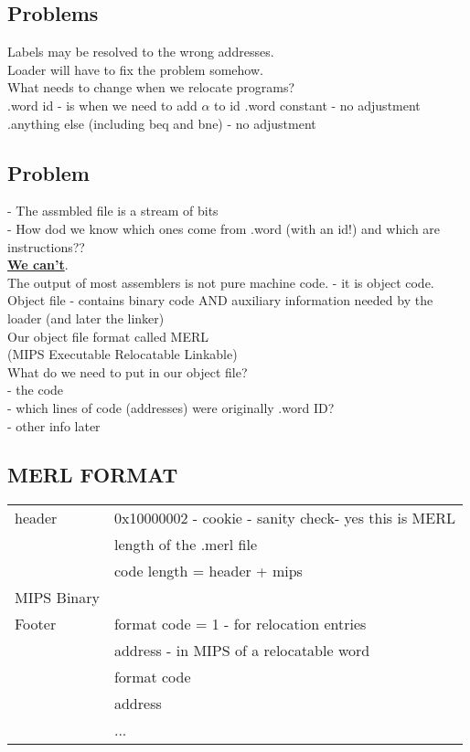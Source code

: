 \documentclass[12pt]{article}
\newcommand{\myt}[1]{\textbf{\underline{#1}}}
\begin{document}
	\subsection*{Problems}
	
	Labels may be resolved to the wrong addresses.\\
	Loader will have to fix the problem somehow.\\
	
	What needs to change when we relocate programs?\\
	
	.word id - is when we need to add $\alpha$ to id
	.word constant - no adjustment\\
	.anything else (including beq and bne) - no adjustment\\
	
	\subsection*{Problem}
	- The assmbled file is a stream of bits\\
	- How dod we know which ones come from .word (with an id!) and which are instructions??\\
	\myt{We can't}.\\
	
	The output of most assemblers is not pure machine code. - it is object code.\\
	
	Object file - contains binary code AND auxiliary information needed by the loader (and later the linker)\\
	
	Our object file format called MERL\\
	(MIPS Executable Relocatable Linkable)\\
	
	What do we need to put in our object file?\\
	- the code\\
	- which lines of code (addresses) were originally .word ID?\\
	- other info later
	
	\subsection{MERL FORMAT}
	
	\begin{tabular}{ l | l }
		header & 0x10000002 - cookie - sanity check- yes this is MERL \\
		& length of the .merl file\\
		& code length = header + mips \\ \hline
		MIPS Binary & \\ \hline
		Footer & format code = 1 - for relocation entries \\
		& address - in MIPS of a relocatable word\\
		& format code \\
		& address \\
		& ...\\ \hline
	\end{tabular}
	
\end{document}
